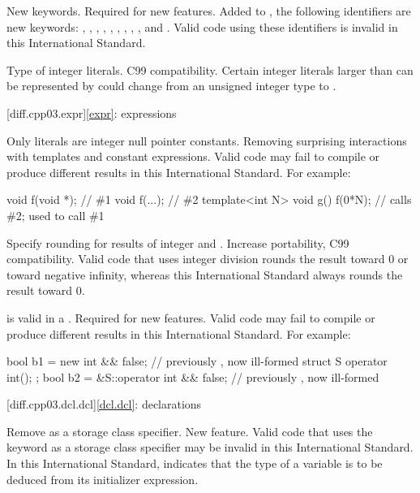 \change
New keywords.
\rationale
Required for new features.
\effect
Added to , the following identifiers are new keywords:
,
,
,
,
,
,
,
,
,
and
.
Valid \CppIII{} code using these identifiers is invalid in this International
Standard.

\change
Type of integer literals.
\rationale
C99 compatibility.
\effect
Certain integer literals larger than can be represented by  could
change from an unsigned integer type to .

[diff.cpp03.expr]{\ref{expr}: expressions}

\change
Only literals are integer null pointer constants.
\rationale
Removing surprising interactions with templates and constant
expressions.
\effect
Valid \CppIII{} code may fail to compile or produce different results in
this International Standard.
For example:
\begin{codeblock}
void f(void *);     // \#1
void f(...);        // \#2
template<int N> void g() {
  f(0*N);           // calls \#2; used to call \#1
}
\end{codeblock}

\change
Specify rounding for results of integer \tcode{/} and \tcode{\%}.
\rationale
Increase portability, C99 compatibility.
\effect
Valid \CppIII{} code that uses integer division rounds the result toward 0 or
toward negative infinity, whereas this International Standard always rounds
the result toward 0.

\change
\tcode{\&\&} is valid in a .
\rationale
Required for new features.
\effect
Valid \CppIII{} code may fail to compile or produce different results in
this International Standard.
For example:
\begin{codeblock}
bool b1 = new int && false;             // previously , now ill-formed
struct S { operator int(); };
bool b2 = &S::operator int && false;    // previously , now ill-formed
\end{codeblock}

[diff.cpp03.dcl.dcl]{\ref{dcl.dcl}: declarations}

\change
Remove  as a storage class specifier.
\rationale
New feature.
\effect
Valid \CppIII{} code that uses the keyword  as a storage class
specifier may be invalid in this International Standard. In this International
Standard,  indicates that the type of a variable is to be deduced
from its initializer expression.

